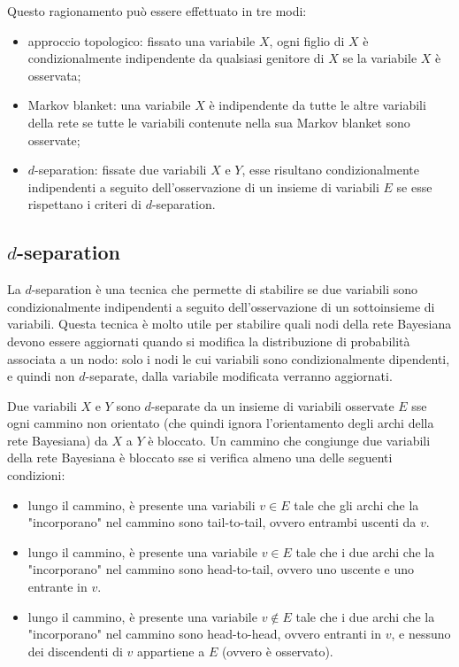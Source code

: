 Questo ragionamento può essere effettuato in tre modi:
\begin{itemize}
    \item approccio topologico: fissato una variabile $X$, ogni figlio
    di $X$ è condizionalmente indipendente da qualsiasi genitore di $X$ se
    la variabile $X$ è osservata;
    \item Markov blanket: una variabile $X$ è indipendente da tutte le
    altre variabili della rete se tutte le variabili contenute nella sua
    Markov blanket sono osservate;
    \item $d$-separation: fissate due variabili $X$ e $Y$, esse risultano
    condizionalmente indipendenti a seguito dell'osservazione di un insieme
    di variabili $E$ se esse rispettano i criteri di $d$-separation.
\end{itemize}

\subsection{$d$-separation}
La $d$-separation è una tecnica che permette di stabilire se due variabili sono
condizionalmente indipendenti a seguito dell'osservazione di un sottoinsieme
di variabili.
Questa tecnica è molto utile per stabilire quali nodi della rete Bayesiana
devono essere aggiornati quando si modifica la distribuzione di probabilità
associata a un nodo: solo i nodi le cui variabili sono condizionalmente
dipendenti, e quindi non $d$-separate, dalla variabile modificata verranno aggiornati.

\begin{defn}
Due variabili $X$ e $Y$ sono $d$-separate da un insieme di variabili osservate
$E$ sse ogni cammino non orientato (che quindi ignora l'orientamento degli
archi della rete Bayesiana) da $X$ a $Y$ è bloccato.
Un cammino che congiunge due variabili della rete Bayesiana è bloccato sse
si verifica almeno una delle seguenti condizioni:
\begin{itemize}
    \item lungo il cammino, è presente una variabili $v \in E$ tale che
    gli archi che la "incorporano" nel cammino sono tail-to-tail, ovvero
    entrambi uscenti da $v$.
    \item lungo il cammino, è presente una variabile $v \in E$ tale che
    i due archi che la "incorporano" nel cammino sono head-to-tail, ovvero
    uno uscente e uno entrante in $v$.
    \item lungo il cammino, è presente una variabile $v \notin E$ tale che
    i due archi che la "incorporano" nel cammino sono head-to-head, ovvero
    entranti in $v$, e nessuno dei discendenti di $v$ appartiene a $E$
    (ovvero è osservato).
\end{itemize}
\end{defn}

